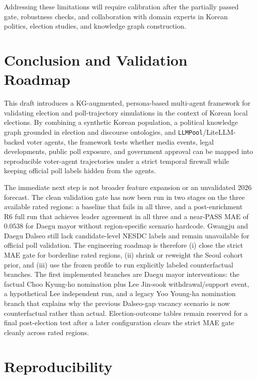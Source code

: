 \documentclass[11pt]{article}
\begin{document}
Addressing these limitations will require calibration after the partially passed gate, robustness checks, and collaboration with domain experts in Korean politics, election studies, and knowledge graph construction.

\section{Conclusion and Validation Roadmap}

This draft introduces a KG-augmented, persona-based multi-agent framework for validating election and poll-trajectory simulations in the context of Korean local elections. By combining a synthetic Korean population, a political knowledge graph grounded in election and discourse ontologies, and \texttt{LLMPool}/LiteLLM-backed voter agents, the framework tests whether media events, legal developments, public poll exposure, and government approval can be mapped into reproducible voter-agent trajectories under a strict temporal firewall while keeping official poll labels hidden from the agents.

The immediate next step is not broader feature expansion or an unvalidated 2026 forecast. The clean validation gate has now been run in two stages on the three available rated regions: a baseline that fails in all three, and a post-enrichment R6 full run that achieves leader agreement in all three and a near-PASS MAE of $0.0538$ for Daegu mayor without region-specific scenario hardcode. Gwangju and Daegu Dalseo still lack candidate-level NESDC labels and remain unavailable for official poll validation. The engineering roadmap is therefore (i) close the strict MAE gate for borderline rated regions, (ii) shrink or reweight the Seoul cohort prior, and (iii) use the frozen profile to run explicitly labeled counterfactual branches. The first implemented branches are Daegu mayor interventions: the factual Choo Kyung-ho nomination plus Lee Jin-sook withdrawal/support event, a hypothetical Lee independent run, and a legacy Yoo Young-ha nomination branch that explains why the previous Dalseo-gap vacancy scenario is now counterfactual rather than actual. Election-outcome tables remain reserved for a final post-election test after a later configuration clears the strict MAE gate cleanly across rated regions.




\appendix

\section{Reproducibility}
\label{app:repro}
\end{document}
